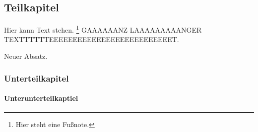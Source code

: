 \subsection{Teilkapitel}
\label{sec:Teilkapitel}


Hier kann Text stehen. \footnote{Hier steht eine Fußnote.}
GAAAAAANZ LAAAAAAAAANGER TEXTTTTTTEEEEEEEEEEEEEEEEEEEEEEEEEET.

\noindent
Neuer Absatz.
\subsubsection{Unterteilkapitel}
\label{sec:Unterteilkapitel}

\paragraph{Unterunterteilkaptiel}
\label{sec:Unterunterteilkaptiel}